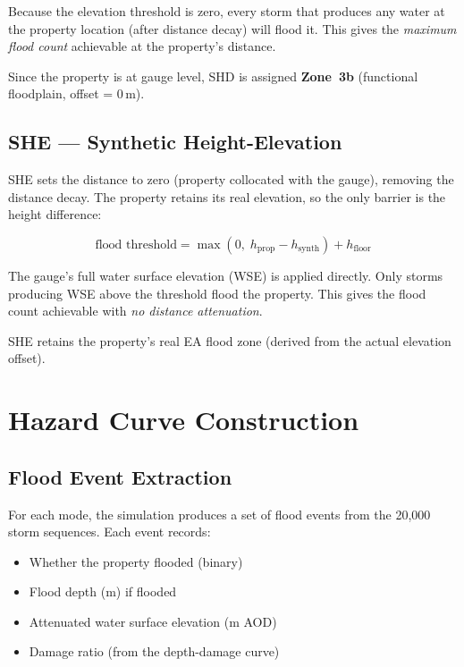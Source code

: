 \documentclass[11pt,a4paper]{article}
\begin{document}
\noindent Because the elevation threshold is zero, every storm that produces any water
at the property location (after distance decay) will flood it. This gives the
\emph{maximum flood count} achievable at the property's distance.

Since the property is at gauge level, SHD is assigned \textbf{Zone~3b} (functional
floodplain, offset = 0\,m).

\subsection{SHE --- Synthetic Height-Elevation}

SHE sets the distance to zero (property collocated with the gauge), removing the
distance decay. The property retains its real elevation, so the only barrier is the
height difference:

\begin{equation}
    \text{flood threshold} = \max(0,\; h_{\text{prop}} - h_{\text{synth}}) + h_{\text{floor}}
\end{equation}

\noindent The gauge's full water surface elevation (WSE) is applied directly. Only storms
producing WSE above the threshold flood the property. This gives the flood count
achievable with \emph{no distance attenuation}.

SHE retains the property's real EA flood zone (derived from the actual elevation offset).


\section{Hazard Curve Construction}

\subsection{Flood Event Extraction}

For each mode, the simulation produces a set of flood events from the 20{,}000 storm
sequences. Each event records:

\begin{itemize}[nosep]
    \item Whether the property flooded (binary)
    \item Flood depth (m) if flooded
    \item Attenuated water surface elevation (m AOD)
    \item Damage ratio (from the depth-damage curve)
\end{itemize}
\end{document}
